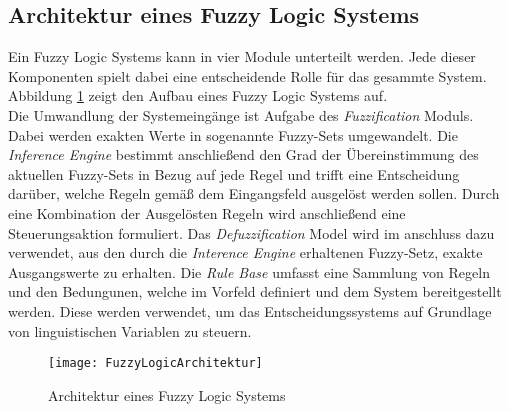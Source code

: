 \subsection{Architektur eines Fuzzy Logic Systems}
Ein Fuzzy Logic Systems kann in vier Module unterteilt werden. Jede dieser Komponenten spielt dabei eine entscheidende Rolle für das gesammte System. 
Abbildung \ref{fig:FuzzyLogicArchitektur} zeigt den Aufbau eines Fuzzy Logic Systems auf.\\
Die Umwandlung der Systemeingänge ist Aufgabe des \textit{Fuzzification} Moduls. Dabei werden exakten Werte in sogenannte Fuzzy-Sets umgewandelt. Die \textit{Inference Engine} bestimmt anschließend den Grad der Übereinstimmung des aktuellen Fuzzy-Sets in Bezug auf jede Regel und trifft eine Entscheidung darüber, welche Regeln gemäß dem Eingangsfeld ausgelöst werden sollen. Durch eine Kombination der Ausgelösten Regeln wird anschließend eine Steuerungsaktion formuliert. Das \textit{Defuzzification} Model wird im anschluss dazu verwendet, aus den durch die \textit{Interence Engine} erhaltenen Fuzzy-Setz, exakte Ausgangswerte zu erhalten.
Die \textit{Rule Base} umfasst eine Sammlung von Regeln und den  Bedungunen, welche im Vorfeld definiert und dem System bereitgestellt werden. Diese werden verwendet, um das Entscheidungssystems auf Grundlage von linguistischen Variablen zu steuern. \cite{FuzzyLogicGeeks}\\
\vspace{-1cm}
\begin{center}
    \begin{figure}[h]
     \centering
     \texttt{[image: FuzzyLogicArchitektur]}
     \caption{Architektur eines Fuzzy Logic Systems \cite{FuzzyLogicGeeks}}
     \label{fig:FuzzyLogicArchitektur}
    \end{figure}
   \end{center}

